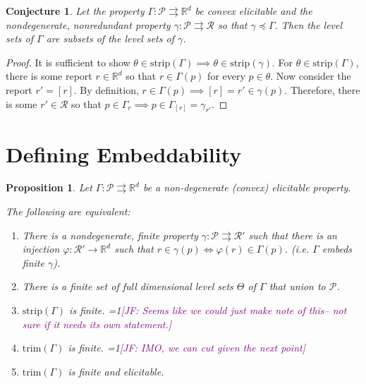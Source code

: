 \documentclass[12pt]{article}
\newcommand{\Comments}{1}
\newcommand{\mynote}[2]{\ifnum\Comments=1\textcolor{#1}{#2}\fi}
\newcommand{\jessie}[1]{\mynote{purple}{[JF: #1]}}
\newcommand{\reals}{\mathbb{R}}
\renewcommand{\P}{\mathcal{P}}
\newcommand{\R}{\mathcal{R}}
\newcommand{\toto}{\rightrightarrows}
\newcommand{\trim}{\mathrm{trim}}
\newcommand{\strip}{\mathrm{strip}}
\newtheorem{proposition}{Proposition}
\newtheorem{conjecture}{Conjecture}
\begin{document}
\begin{conjecture}\label{conj:lev-sets-subsets}
	Let the property $\Gamma: \P \toto \reals^d$ be convex elicitable and the nondegenerate, nonredundant property $\gamma: \P \toto \R$ so that $\gamma \preceq \Gamma$.
	Then the level sets of $\Gamma$ are subsets of the level sets of $\gamma$.
\end{conjecture}

\begin{proof}
	It is sufficient to show $\theta \in \strip(\Gamma) \implies \theta \in \strip(\gamma)$.
	For $\theta \in \strip(\Gamma)$, there is some report $r \in \reals^d$ so that $r \in \Gamma(p)$ for every $p \in \theta$.
	Now consider the report $r' = [r]$.
	By definition, $r \in \Gamma(p) \implies [r] = r' \in \gamma(p)$.
	Therefore, there is some $r' \in \R$ so that $p \in \Gamma_r \implies p \in \Gamma_{[r]} = \gamma_{r'}$.
%	
\end{proof}




\section{Defining Embeddability}


\begin{proposition}\label{prop:optimal-reports-per-level-set}
  Let $\Gamma:\P\toto\reals^d$ be a non-degenerate (convex) elicitable property.

  The following are equivalent:
  \begin{enumerate}
  \item There is a nondegenerate, finite property $\gamma:\P\toto\R'$ such that there is an injection $\varphi:\R'\to\reals^d$ such that $r\in\gamma(p) \iff \varphi(r) \in \Gamma(p)$. (i.e. $\Gamma$ embeds finite $\gamma$).  
    
  \item There is a finite set of full dimensional level sets $\Theta$ of $\Gamma$ that union to $\P$.
  \item $\strip(\Gamma)$ is finite. \jessie{Seems like we could just make note of this-- not sure if it needs its own statement.}
  \item $\trim(\Gamma)$ is finite. \jessie{IMO, we can cut given the next point}
  \item $\trim(\Gamma)$ is finite and elicitable.
  \end{enumerate}
\end{proposition}
\end{document}
